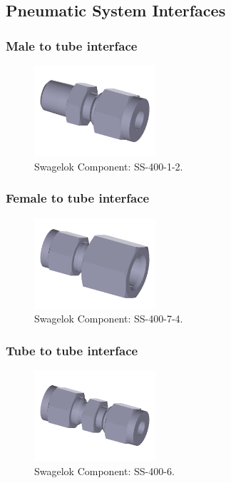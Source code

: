 \subsection{Pneumatic System Interfaces}
\label{sec:appP}

\subsubsection{Male to tube interface}

\begin{figure}[H]
    \centering
    \includegraphics[width=0.4\textwidth]{appendix/img/interfaces/SS-400-1-2-SwagelokCompany-07-10-2018.png}
    \caption{Swagelok Component: SS-400-1-2.}
    \label{fig:male_interface}
\end{figure}


\subsubsection{Female to tube interface}

\begin{figure}[H]
    \centering
    \includegraphics[width=0.4\textwidth]{appendix/img/interfaces/SS-400-7-4-SwagelokCompany-07-10-2018.png}
    \caption{Swagelok Component: SS-400-7-4.}
    \label{fig:FEmale_interface}
\end{figure}

\subsubsection{Tube to tube interface}

\begin{figure}[H]
    \centering
    \includegraphics[width=0.4\textwidth]{appendix/img/interfaces/SS-400-6-SwagelokCompany-07-10-2018.png}
    \caption{Swagelok Component: SS-400-6.}
    \label{fig:STRAIGHT_interface}
\end{figure}


